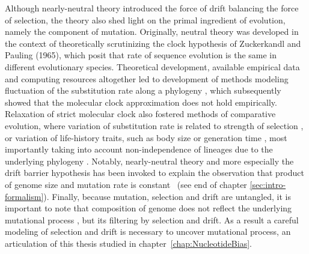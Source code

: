 Although nearly-neutral theory introduced the force of drift balancing the force of selection, the theory also shed light on the primal ingredient of evolution, namely the component of mutation.
Originally, neutral theory was developed in the context of theoretically scrutinizing the clock hypothesis of Zuckerkandl and Pauling (1965), which posit that rate of sequence evolution is the same in different evolutionary species.
Theoretical development, available empirical data and computing resources altogether led to development of methods modeling fluctuation of the substitution rate along a phylogeny \citep{Thorne1998}, which subsequently showed that the molecular clock approximation does not hold empirically.
Relaxation of strict molecular clock also fostered methods of comparative evolution, where variation of substitution rate is related to strength of selection \citep{Seo2004}, or variation of life-history traits, such as body size or generation time \citep{Lartillot2012}, most importantly taking into account non-independence of lineages due to the underlying phylogeny \citep{Lanfear2010a}.
Notably, nearly-neutral theory and more especially the drift barrier hypothesis has been invoked to explain the observation that product of genome size and mutation rate is constant~\citep{Lynch2016a} (see end of chapter \ref{sec:intro-formalism}).
Finally, because mutation, selection and drift are untangled, it is important to note that composition of genome does not reflect the underlying mutational process \citep{Singer2000}, but its filtering by selection and drift.
As a result a careful modeling of selection and drift is necessary to uncover mutational process, an articulation of this thesis studied in chapter~\ref{chap:NucleotideBias}.

